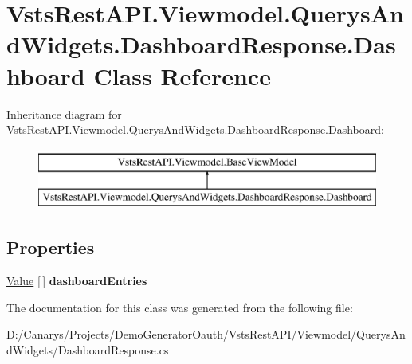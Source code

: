 \hypertarget{class_vsts_rest_a_p_i_1_1_viewmodel_1_1_querys_and_widgets_1_1_dashboard_response_1_1_dashboard}{}\section{Vsts\+Rest\+A\+P\+I.\+Viewmodel.\+Querys\+And\+Widgets.\+Dashboard\+Response.\+Dashboard Class Reference}
\label{class_vsts_rest_a_p_i_1_1_viewmodel_1_1_querys_and_widgets_1_1_dashboard_response_1_1_dashboard}
Inheritance diagram for Vsts\+Rest\+A\+P\+I.\+Viewmodel.\+Querys\+And\+Widgets.\+Dashboard\+Response.\+Dashboard\+:\begin{figure}[H]
\begin{center}
\leavevmode
\includegraphics[height=2.000000cm]{class_vsts_rest_a_p_i_1_1_viewmodel_1_1_querys_and_widgets_1_1_dashboard_response_1_1_dashboard}
\end{center}
\end{figure}
\subsection*{Properties}
\begin{DoxyCompactItemize}
\item 
\mbox{\label{class_vsts_rest_a_p_i_1_1_viewmodel_1_1_querys_and_widgets_1_1_dashboard_response_1_1_dashboard_ae51b380c89a04e8a479a1e52b2ace90f}} 
\mbox{\hyperlink{class_vsts_rest_a_p_i_1_1_viewmodel_1_1_querys_and_widgets_1_1_dashboard_response_1_1_value}{Value}} \mbox{[}$\,$\mbox{]} {\bfseries dashboard\+Entries}
\end{DoxyCompactItemize}


The documentation for this class was generated from the following file\+:\begin{DoxyCompactItemize}
\item 
D\+:/\+Canarys/\+Projects/\+Demo\+Generator\+Oauth/\+Vsts\+Rest\+A\+P\+I/\+Viewmodel/\+Querys\+And\+Widgets/Dashboard\+Response.\+cs\end{DoxyCompactItemize}
